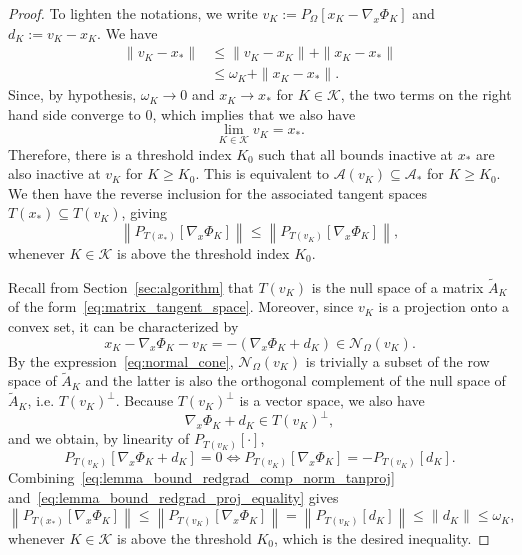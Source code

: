 \documentclass{article}
\numberwithin{equation}{section}
\newcommand{\calA}{{\mathcal{A}}}
\newcommand{\calK}{{\mathcal{K}}}
\newcommand{\calN}{{\mathcal{N}}}
\newcommand{\proj}[2]{P_{#1} \left[ {#2} \right]} %
\theoremstyle{plain}
\begin{document}
	\begin{proof}
		To lighten the notations, we write $v_K := \proj{\Omega}{x_K - \nabla_x \Phi_K}$ and $d_K := v_K - x_K$. We have
		\begin{equation*}
			\begin{split}
				\|v_K - x_*\| &\le \|v_K - x_K\| + \| x_K - x_*\| \\
				& \le \omega_K + \| x_K - x_*\|.
			\end{split}
		\end{equation*}
		Since, by hypothesis, $\omega_K \to 0$ and $x_K \to x_*$ for $K\in \calK$, the two terms on the right hand side converge to $0$, which implies that we also have
		\begin{equation*}
			\lim\limits_{K \in \calK} v_K = x_*.
		\end{equation*}
		Therefore, there is a threshold index $K_0$ such that all bounds inactive at $x_*$ are also inactive at $v_K$ for $K \ge K_0$. This is equivalent to $\calA(v_K) \subseteq \calA_*$ for $K\ge K_0$. We then have the reverse inclusion for the associated tangent spaces $T(x_*) \subseteq T(v_K)$, giving
		\begin{equation}\label{eq:lemma_bound_redgrad_comp_norm_tanproj}
			\left\| \proj{T(x_*)}{\nabla_x \Phi_K} \right\| \le \left\| \proj{T(v_K)}{\nabla_x \Phi_K} \right\|,
		\end{equation}
		whenever $K\in \calK$ is above the threshold index $K_0$.
		
		Recall from Section~\ref{sec:algorithm} that $T(v_K)$ is the null space of a matrix $\tilde A_K$ of the form~\eqref{eq:matrix_tangent_space}. Moreover, since $v_K$ is a projection onto a convex set, it can be characterized by
		\begin{equation*}
			x_K - \nabla_x \Phi_K - v_K = -\left(\nabla_x \Phi_K + d_K\right) \in \calN_\Omega(v_K).
		\end{equation*} 
		By the expression~\eqref{eq:normal_cone}, $\calN_\Omega(v_K)$ is trivially a subset of the row space of $\tilde A_K$ and the latter is also the orthogonal complement of the null space of $\tilde A_K$, i.e.  $T(v_K)^\perp$. 
		Because $T(v_K)^\perp$ is a vector space, we also have
		\[\nabla_x \Phi_K + d_K \in T(v_K)^\perp,\]
		and we obtain, by linearity of $\proj{T(v_K)}{\cdot}$,
		\begin{equation}\label{eq:lemma_bound_redgrad_proj_equality}
			\proj{T(v_K)}{\nabla_x \Phi_K + d_K} = 0 \iff \proj{T(v_K)}{\nabla_x \Phi_K} = -\proj{T(v_K)}{d_K}.
		\end{equation}
		Combining~\eqref{eq:lemma_bound_redgrad_comp_norm_tanproj} and~\eqref{eq:lemma_bound_redgrad_proj_equality} gives
		\begin{equation*}
			\left\| \proj{T(x_*)}{\nabla_x \Phi_K} \right\| \le \left\| \proj{T(v_K)}{\nabla_x \Phi_K} \right\| = \left\| \proj{T(v_K)}{d_K} \right\| \le \|d_K\| \le \omega_K,
		\end{equation*}
		whenever $K \in \calK$ is above the threshold $K_0$, which is the desired inequality.
	\end{proof}
	
\end{document}
